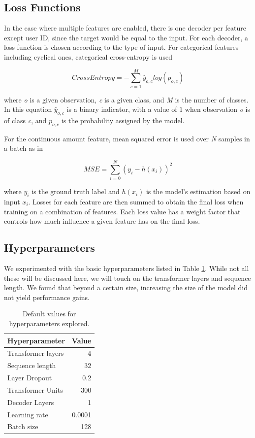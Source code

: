 \documentclass{article}
\begin{document}
\subsection{Loss Functions}
In the case where multiple features are enabled, there is one decoder per feature except user ID, since the target would be equal to the input. For each decoder, a loss function is chosen according to the type of input. For categorical features including cyclical ones, categorical cross-entropy is used 

\begin{equation}
  CrossEntropy=-\sum_{c=1}^M \hat{y}_{o,c}  log(p_{o,c})
\end{equation}

where \textit{o} is a given observation, \textit{c} is a given class, and \textit{M} is the number of classes. In this equation $\hat{y}_{o,c}$ is a binary indicator, with a value of $1$ when observation \textit{o} is of class \textit{c}, and $p_{o,c}$ is the probability assigned by the model.

For the continuous amount feature, mean squared error is used over \textit{N} samples in a batch as in

\begin{equation}
  MSE=\sum_{i=0}^N (y_i - h(x_i))^2
\end{equation}

where $y_i$ is the ground truth label and $h(x_i)$ is the model's estimation based on input $x_i$. Losses for each feature are then summed to obtain the final loss when training on a combination of features. Each loss value has a weight factor that controls how much influence a given feature has on the final loss. 

\subsection{Hyperparameters}
We experimented with the basic hyperparameters listed in Table \ref{hparam-defaults}. While not all these will be discussed here, we will touch on the transformer layers and sequence length. We found that beyond a certain size, increasing the size of the model did not yield performance gains.

\begin{table}
  \caption{Default values for hyperparameters explored.}
  \label{hparam-defaults}
  \centering
  \begin{tabular}{l|r}
    \toprule
    Hyperparameter &
    		Value \\
    \midrule
    Transformer layers &  4\\
    Sequence length & 32\\
    Layer Dropout & 0.2 \\
    Transformer Units &  300\\
    Decoder Layers &  1 \\
    Learning rate &  0.0001 \\
    Batch size & 128\\
    \bottomrule
  \end{tabular}
\end{table}
\end{document}
